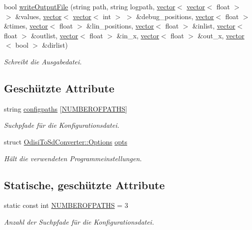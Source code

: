 \begin{DoxyCompactItemize}
bool \hyperlink{classOdisiToSdConverter_a58c9836341b5aa5d8fa8eb28021b070b}{write\-Output\-File} (string path, string logpath, \hyperlink{classstd_1_1vector}{vector}$<$ \hyperlink{classstd_1_1vector}{vector}$<$ float $>$ $>$ \&values, \hyperlink{classstd_1_1vector}{vector}$<$ \hyperlink{classstd_1_1vector}{vector}$<$ int $>$ $>$ \&debug\-\_\-positions, \hyperlink{classstd_1_1vector}{vector}$<$ float $>$ \&times, \hyperlink{classstd_1_1vector}{vector}$<$ float $>$ \&lin\-\_\-positions, \hyperlink{classstd_1_1vector}{vector}$<$ float $>$ \&inlist, \hyperlink{classstd_1_1vector}{vector}$<$ float $>$ \&outlist, \hyperlink{classstd_1_1vector}{vector}$<$ float $>$ \&in\-\_\-x, \hyperlink{classstd_1_1vector}{vector}$<$ float $>$ \&out\-\_\-x, \hyperlink{classstd_1_1vector}{vector}$<$ bool $>$ \&dirlist)
\begin{DoxyCompactList}\small\item\em Schreibt die Ausgabedatei. \end{DoxyCompactList}\end{DoxyCompactItemize}
\subsection*{Geschützte Attribute}
\begin{DoxyCompactItemize}
\item 
string \hyperlink{classOdisiToSdConverter_aeecf67d22a4b6333ceabe5f1a1036736}{configpaths} \mbox{[}\hyperlink{classOdisiToSdConverter_a6f59f3670356c1588b736af33d59532a}{N\-U\-M\-B\-E\-R\-O\-F\-P\-A\-T\-H\-S}\mbox{]}
\begin{DoxyCompactList}\small\item\em Suchpfade für die Konfigurationsdatei. \end{DoxyCompactList}\item 
struct \hyperlink{structOdisiToSdConverter_1_1Options}{Odisi\-To\-Sd\-Converter\-::\-Options} \hyperlink{classOdisiToSdConverter_a032865606668d520887b2b164913539d}{opts}
\begin{DoxyCompactList}\small\item\em Hält die verwendeten Programmeinstellungen. \end{DoxyCompactList}\end{DoxyCompactItemize}
\subsection*{Statische, geschützte Attribute}
\begin{DoxyCompactItemize}
\item 
static const int \hyperlink{classOdisiToSdConverter_a6f59f3670356c1588b736af33d59532a}{N\-U\-M\-B\-E\-R\-O\-F\-P\-A\-T\-H\-S} = 3
\begin{DoxyCompactList}\small\item\em Anzahl der Suchpfade für die Konfigurationsdatei. \end{DoxyCompactList}\end{DoxyCompactItemize}


